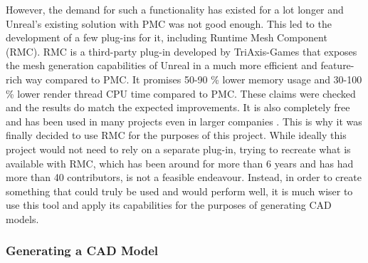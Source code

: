 However, the demand for such a functionality has existed for a lot longer and Unreal's existing solution with \acs{PMC} was not good enough. This led to the development of a few plug-ins for it, including Runtime Mesh Component (\acs{RMC}). \acs{RMC} is a third-party plug-in developed by TriAxis-Games that exposes the mesh generation capabilities of Unreal in a much more efficient and feature-rich way compared to \acs{PMC}\cite{bib:RMC}. It promises 50-90 \% lower memory usage and 30-100 \% lower render thread CPU time compared to \acs{PMC}. These claims were checked and the results do match the expected improvements. It is also completely free and has been used in many projects even in larger companies \cite{bib:RMC}. This is why it was finally decided to use \acs{RMC} for the purposes of this project. While ideally this project would not need to rely on a separate plug-in, trying to recreate what is available with \acs{RMC}, which has been around for more than 6 years and has had more than 40 contributors, is not a feasible endeavour. Instead, in order to create something that could truly be used and would perform well, it is much wiser to use this tool and apply its capabilities for the purposes of generating \acs{CAD} models.

\subsubsection{Generating a CAD Model}\label{chp:Generating}

